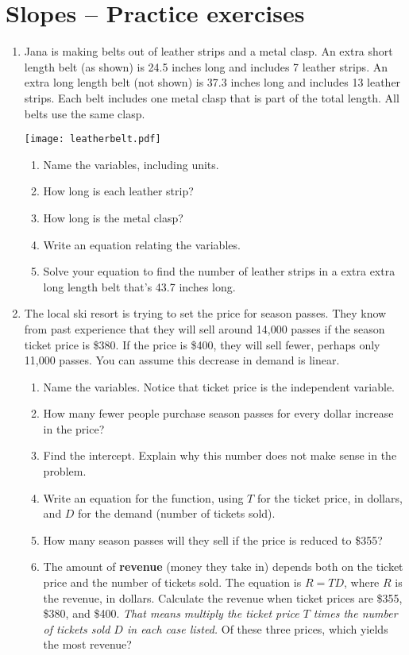 \section{Slopes -- Practice exercises}

\begin{enumerate}
\item Jana is making belts out of leather strips and a metal clasp.  An extra short length belt (as shown) is 24.5 inches long and includes 7 leather strips.  An extra long length belt (not shown) is 37.3 inches long and includes 13 leather strips.  Each belt includes one metal clasp that is part of the total length.  All belts use the same clasp.
\begin{center}
\scalebox{.5} {\texttt{[image: leatherbelt.pdf]} }
\end{center}
\begin{enumerate}
\item Name the variables, including units. \vfill
\item How long is each leather strip? \vfill
\item How long is the metal clasp?  \vfill
\item Write an equation relating the variables. \vfill
\item Solve your equation to find the number of leather strips in a extra extra long length belt that's 43.7 inches long. \vfill \vfill
\end{enumerate}

\newpage %

\item The local ski resort is trying to set the price for season passes.  They know from past experience that they will sell around 14,000 passes if the season ticket price is \$380.  If the price is \$400, they will sell fewer, perhaps only 11,000 passes.  You can assume this decrease in demand is linear.
\begin{enumerate}
\item Name the variables.  Notice that ticket price is the independent variable. \vfill
\item How many fewer people purchase season passes for every dollar increase in the price? \vfill
\item Find the intercept.  Explain why this number does not make sense in the problem. \vfill
\item Write an equation for the function, using $T$ for the ticket price, in dollars, and $D$ for the demand (number of tickets sold). \vfill
\item How many season passes will they sell if the price is reduced to \$355? \vfill
\item The amount of \textbf{revenue} (money they take in) depends both on the ticket price and the number of tickets sold.  The equation is $R = TD$, where $R$ is the revenue, in dollars.  Calculate the revenue when ticket prices are \$355, \$380, and \$400.  \emph{That means multiply the ticket price $T$ times the number of tickets sold $D$ in each case listed.}  Of these three prices, which yields the most revenue? \vfill \vfill
\end{enumerate}


\end{enumerate}
